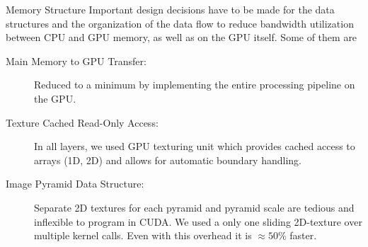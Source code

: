\documentclass[final]{beamer}
\begin{document}
\begin{frame}{}
\begin{columns}[t]
      \begin{column}{.48\linewidth}
        \begin{block}{Memory Structure}
          Important design decisions have to be made for the data structures and
the organization of the data flow to reduce bandwidth utilization
between CPU and GPU memory, as well as on the GPU itself. Some of them are
\begin{description}
\item[ Main Memory to GPU Transfer: ] 
Reduced to a minimum by implementing the entire processing pipeline on the GPU.\\
\item[ Texture Cached Read-Only Access:]
In all layers, we used GPU texturing unit which provides cached access to arrays (1D, 2D) and allows for automatic boundary handling.
\item [ Image Pyramid Data Structure:]
Separate 2D textures for each pyramid and pyramid scale are tedious and inflexible to program in CUDA.
We used a only one sliding 2D-texture over multiple kernel calls. Even with this overhead it is $\approx 50\%$ faster.
\newline
\end{description}
        \end{block}
				



\end{column}
\end{columns}
\end{frame}
\end{document}
